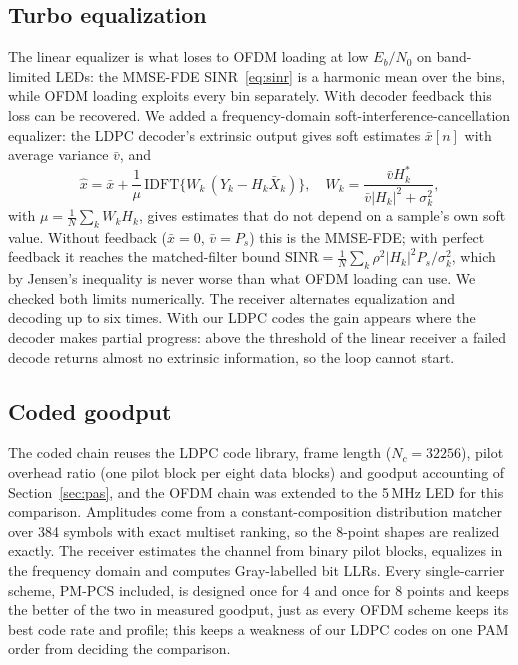 \documentclass[conference]{IEEEtran}
\begin{document}
\subsection{Turbo equalization}\label{sec:turbo}
The linear equalizer is what loses to OFDM loading at low $E_b/N_0$ on band-limited LEDs: the MMSE-FDE SINR~\eqref{eq:sinr} is a harmonic mean over the bins, while OFDM loading exploits every bin separately. With decoder feedback this loss can be recovered. We added a frequency-domain soft-interference-cancellation equalizer: the LDPC decoder's extrinsic output gives soft estimates $\bar x[n]$ with average variance $\bar v$, and
\begin{equation}
\hat x=\bar x+\frac{1}{\mu}\,\mathrm{IDFT}\big\{W_k\,(Y_k-H_k\bar X_k)\big\},\quad W_k=\frac{\bar v H_k^*}{\bar v|H_k|^2+\sigma_k^2},\label{eq:turbo}
\end{equation}
with $\mu=\frac1N\sum_kW_kH_k$, gives estimates that do not depend on a sample's own soft value. Without feedback ($\bar x=0$, $\bar v=P_s$) this is the MMSE-FDE; with perfect feedback it reaches the matched-filter bound $\mathrm{SINR}=\frac1N\sum_k\rho^2|H_k|^2P_s/\sigma_k^2$, which by Jensen's inequality is never worse than what OFDM loading can use. We checked both limits numerically. The receiver alternates equalization and decoding up to six times. With our LDPC codes the gain appears where the decoder makes partial progress: above the threshold of the linear receiver a failed decode returns almost no extrinsic information, so the loop cannot start.

\subsection{Coded goodput}
The coded chain reuses the LDPC code library, frame length ($N_c=32256$), pilot overhead ratio (one pilot block per eight data blocks) and goodput accounting of Section~\ref{sec:pas}, and the OFDM chain was extended to the 5\,MHz LED for this comparison. Amplitudes come from a constant-composition distribution matcher over 384 symbols with exact multiset ranking, so the 8-point shapes are realized exactly. The receiver estimates the channel from binary pilot blocks, equalizes in the frequency domain and computes Gray-labelled bit LLRs. Every single-carrier scheme, PM-PCS included, is designed once for 4 and once for 8 points and keeps the better of the two in measured goodput, just as every OFDM scheme keeps its best code rate and profile; this keeps a weakness of our LDPC codes on one PAM order from deciding the comparison.
\end{document}
